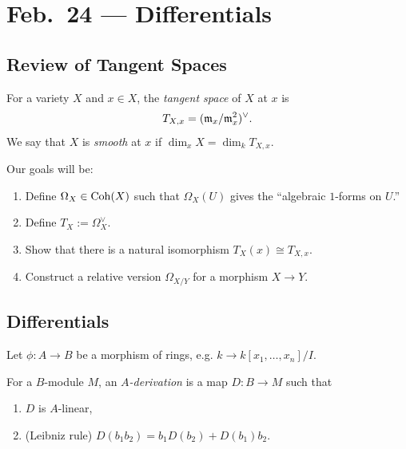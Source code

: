 \chapter{Feb.~24 --- Differentials}

\section{Review of Tangent Spaces}

\begin{definition}
  For a variety $X$ and $x \in X$,
  the \emph{tangent space} of $X$ at $x$ is
  \[
    T_{X, x}
    = (\mathfrak{m}_x / \mathfrak{m}_x^2)^\vee.
  \]
  We say that $X$ is \emph{smooth} at
  $x$ if $\dim_x X = \dim_k T_{X, x}$.
\end{definition}

\begin{remark}
  Our goals will be:
  \begin{enumerate}
    \item Define $\Omega_X \in \operatorname{Coh}(X)$
      such that $\Omega_X(U)$ gives the
      ``algebraic $1$-forms on $U$.''
    \item Define $T_X := \Omega_X^\vee$.
    \item Show that there is a natural
      isomorphism $T_X(x) \cong T_{X, x}$.
    \item Construct a relative version
      $\Omega_{X / Y}$ for a morphism
      $X \to Y$.
  \end{enumerate}
\end{remark}

\section{Differentials}

\begin{remark}
  Let $\phi : A \to B$ be a morphism
  of rings, e.g.
  $k \to k[x_1, \dots, x_n] / I$.
\end{remark}

\begin{definition}
  For a $B$-module $M$, an
  \emph{$A$-derivation} is a map
  $D : B \to M$ such that
  \begin{enumerate}
    \item $D$ is $A$-linear,
    \item (Leibniz rule)
      $D(b_1 b_2) = b_1 D(b_2) + D(b_1) b_2$.
  \end{enumerate}
\end{definition}

